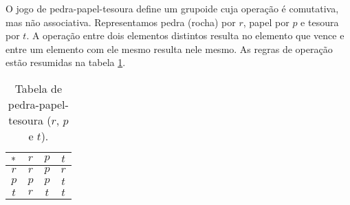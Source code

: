 \begin{example}
O jogo de pedra-papel-tesoura define um grupoide cuja operação é comutativa, mas não associativa. Representamos pedra (rocha) por $r$, papel por $p$ e tesoura por $t$. A operação entre dois elementos distintos resulta no elemento que vence e entre um elemento com ele mesmo resulta nele mesmo. As regras de operação estão resumidas na tabela \ref{tab:operacao.pedrapapeltesousa}.
\end{example}

\begin{table}
	\centering

	\begin{tabular}{c | c c c}
	\toprule
	$\ast$	&	$r$	&	$p$	&	$t$ \\
	\hline
	$r$		&	$r$	&	$p$	&	$r$ \\
	$p$		&	$p$	&	$p$	&	$t$ \\
	$t$		&	$r$	&	$t$	&	$t$ \\
	\bottomrule
	\end{tabular}
%

	\caption{Tabela de pedra-papel-tesoura ($r$, $p$ e $t$).}
	\label{tab:operacao.pedrapapeltesousa}
\end{table}

\begin{comment}

\begin{table}
	\centering

	\begin{tabular}{c | c c c c c}
	$\opb$	&	$r$	&	$p$	&	$t$	&	$s$	&	$l$ \\
	\hline
	$r$		&	$r$	&	$p$	&	$r$	&	$?$	&	$?$ \\
	$p$		&	$p$	&	$p$	&	$t$	&	$?$	&	$?$ \\
	$t$		&	$r$	&	$t$	&	$t$	&	$?$	&	$?$ \\
	$s$		&	$?$	&	$?$	&	$?$	&	$?$	&	$?$ \\
	$l$		&	$?$	&	$?$	&	$?$	&	$?$	&	$?$ \\
	\end{tabular}
%

	\caption{Tabela de pedra-papel-tesoura-Spock-lagarto ($r$, $p$ e $t$).}
	\label{tab:operacao.pedrapapeltesousa}
\end{table}

\end{comment}

